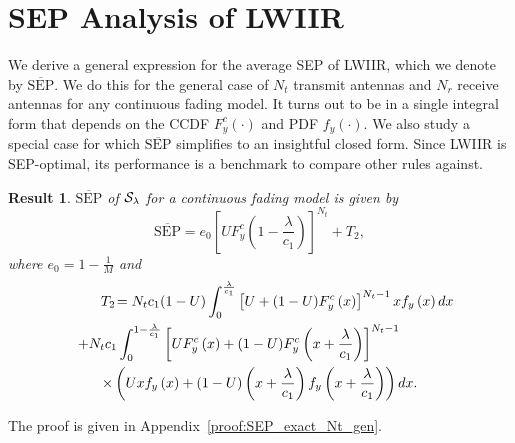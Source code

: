 \documentclass[12pt,draftcls,peerreview,onecolumn]{IEEEtran}
\newtheorem{result}{{\bf Result}}
\newcommand{\tendsto}{\to}
\newcommand{\SEP}{\text{SEP}}
\newcommand{\lam}{\lambda}
\newcommand{\mug}{{\mu_{g}}}
\newcommand{\termtwo}{T_2}
\newcommand{\Nt}{{N_t}}
\newcommand{\Nr}{{N_r}}
\newcommand{\Pt}{{P_t}}
\newcommand{\outmax}{O_{\text{max}}}
\newcommand{\itau}{\tau}
\newcommand{\cone}{c_{1}}
\newcommand{\lambym}{\frac{\lam}{\cone}}
\newcommand{\un}{U}
\newcommand{\zerosep}{e_0}
\newcommand{\callamrule}{{\cal S_{{\lam}}}}
\newcommand{\avgSEP}{\overline{\SEP}}
\newcommand{\pdfyNrgen}[1]{f_{y}\left(#1\right)} %
\newcommand{\ccdfy}[1]{F^{c}_{y}\left(#1 \right)}
\newcommand{\unccdfygen}[2]{{#1} \ccdfy{#2}  }
\newcommand{\ccdfyrv}[1]{ F^{c}_{y}\left(#1 \right) }
\newcommand{\pdfy}[1]{ f_{y}\left( #1 \right) }
\begin{document}


\section{SEP Analysis of LWIIR}
\label{sec:SEPanalysis}
We derive a general expression for the average SEP of LWIIR, which we denote by  $\avgSEP$. We do this for the general case of $\Nt$ transmit antennas and $\Nr$ receive antennas for any continuous fading model. It turns out to be in a single integral form that depends on the CCDF $\ccdfyrv{\cdot}$ and PDF $\pdfy{\cdot}$. We also study a special case for which $\avgSEP$ simplifies to an insightful  closed form. Since LWIIR is SEP-optimal, its performance is a benchmark to compare other  rules against.  %
 

\begin{result}
\label{thm:SEP_exact_Nt_gen}
$\avgSEP$ of $\callamrule$ for a continuous fading model is given by
\begin{equation}
\label{eq:SEP_Nt_gen} 
\avgSEP= \zerosep\left[\unccdfygen{\un}{1-\lambym}\right]^{\Nt} + \termtwo,
\end{equation}
%
where $\zerosep=1-\frac{1}{M}$ and
\begin{multline}
\hspace{25pt}\termtwo \!= \Nt\cone(1-\un)\int_{0}^{\lambym} \left[\un + \unccdfygen{(1-\un)}{x}\right]^{\Nt-1} x\pdfyNrgen{x} dx\\
\hspace{-30pt}+ \Nt\cone \int_{0}^{1-\lambym}
\left[\unccdfygen{\un}{x} +\unccdfygen{(1-\un)}{x+\lambym}  \right]^{\Nt-1}\\
\times\left(\un x\pdfyNrgen{x} + (1-\un)\left(x + \lambym\right) \pdfyNrgen{x + \lambym}\right) dx.
\label{eq:termtwo_gen}
\end{multline}
%
\end{result}
%
\begin{IEEEproof}
The proof is given in Appendix~\ref{proof:SEP_exact_Nt_gen}.
\end{IEEEproof}
%
\end{document}

